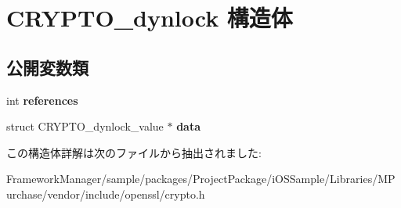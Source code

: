 \hypertarget{struct_c_r_y_p_t_o__dynlock}{}\section{C\+R\+Y\+P\+T\+O\+\_\+dynlock 構造体}
\label{struct_c_r_y_p_t_o__dynlock}
\subsection*{公開変数類}
\begin{DoxyCompactItemize}
\item 
\hypertarget{struct_c_r_y_p_t_o__dynlock_a5a29cc97b740faafbfc38aeb9b8e490d}{}int {\bfseries references}\label{struct_c_r_y_p_t_o__dynlock_a5a29cc97b740faafbfc38aeb9b8e490d}

\item 
\hypertarget{struct_c_r_y_p_t_o__dynlock_ac80047787eba227e04a56ec05ea5e0f2}{}struct C\+R\+Y\+P\+T\+O\+\_\+dynlock\+\_\+value $\ast$ {\bfseries data}\label{struct_c_r_y_p_t_o__dynlock_ac80047787eba227e04a56ec05ea5e0f2}

\end{DoxyCompactItemize}


この構造体詳解は次のファイルから抽出されました\+:\begin{DoxyCompactItemize}
\item 
Framework\+Manager/sample/packages/\+Project\+Package/i\+O\+S\+Sample/\+Libraries/\+M\+Purchase/vendor/include/openssl/crypto.\+h\end{DoxyCompactItemize}
